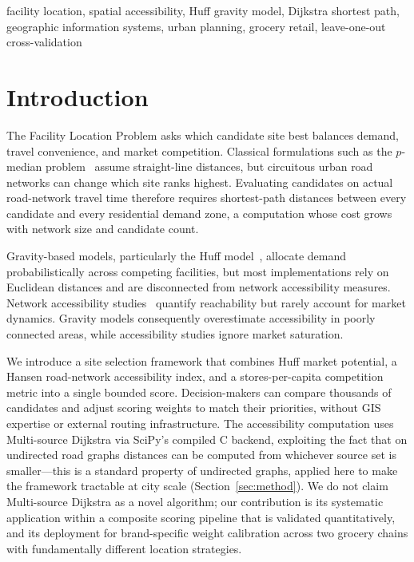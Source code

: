 \documentclass[conference]{IEEEtran}
\begin{document}
\begin{IEEEkeywords}
facility location, spatial accessibility, Huff gravity model,
Dijkstra shortest path, geographic information systems, urban planning,
grocery retail, leave-one-out cross-validation
\end{IEEEkeywords}

\section{Introduction}

The Facility Location Problem asks which candidate site best balances
demand, travel convenience, and market competition. Classical
formulations such as the $p$-median problem~\cite{ReVelle2005} assume
straight-line distances, but circuitous urban road networks can change
which site ranks highest. Evaluating candidates on actual road-network
travel time therefore requires shortest-path distances between every
candidate and every residential demand zone, a computation whose cost
grows with network size and candidate count.

Gravity-based models, particularly the Huff model~\cite{Huff1964},
allocate demand probabilistically across competing facilities, but
most implementations rely on Euclidean distances and are disconnected
from network accessibility measures. Network accessibility
studies~\cite{Hansen1959,Xu2020} quantify reachability but rarely
account for market dynamics. Gravity models consequently overestimate
accessibility in poorly connected areas, while accessibility studies
ignore market saturation.

We introduce a site selection framework that combines Huff market
potential, a Hansen road-network accessibility index, and a
stores-per-capita competition metric into a single bounded score.
Decision-makers can compare thousands of candidates and adjust scoring
weights to match their priorities, without GIS expertise or external
routing infrastructure. The accessibility computation uses
Multi-source Dijkstra via SciPy's compiled C backend, exploiting the
fact that on undirected road graphs distances can be computed from
whichever source set is smaller---this is a standard property of
undirected graphs, applied here to make the framework tractable at
city scale (Section~\ref{sec:method}). We do not claim Multi-source
Dijkstra as a novel algorithm; our contribution is its systematic
application within a composite scoring pipeline that is validated
quantitatively, and its deployment for brand-specific weight
calibration across two grocery chains with fundamentally different
location strategies.
\end{document}
